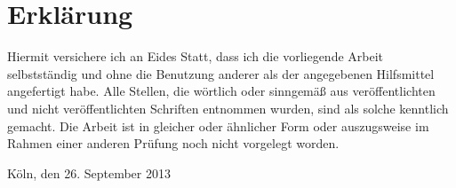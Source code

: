 \section*{Erklärung}

Hiermit versichere ich an Eides Statt, dass ich die vorliegende Arbeit selbstständig und ohne die Benutzung anderer als der angegebenen Hilfsmittel angefertigt habe. 
Alle Stellen, die wörtlich oder sinngemäß aus veröffentlichten und nicht veröffentlichten Schriften entnommen wurden, sind als solche kenntlich gemacht. 
Die Arbeit ist in gleicher oder ähnlicher Form oder auszugsweise im Rahmen einer anderen Prüfung noch nicht vorgelegt worden.

\vspace{30mm}
\begin{flushleft}
    Köln, den 26. September 2013
\end{flushleft}